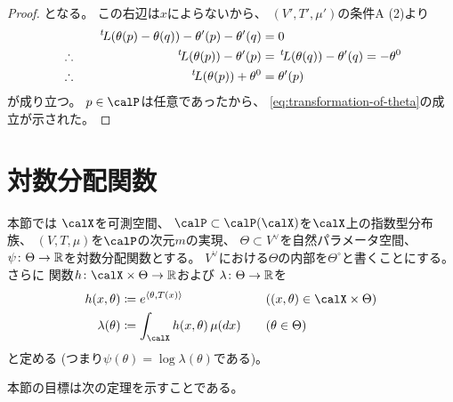 \documentclass[report]{jlreq}
\begin{document}
\begin{proof}
    となる。
    この右辺は$x$によらないから、
    $(V', T', \mu')$の条件A (2)より
    \begin{alignat}{2}
        &\phantom{\therefore} \quad&
            \,{}^{t}\!L(\theta(p) - \theta(q))
                - \theta'(p) - \theta'(q)
                &= 0
            \\
        &\therefore \quad&
            \,{}^{t}\!L(\theta(p)) - \theta'(p)
                &=
                    \,{}^{t}\!L(\theta(q)) - \theta'(q)
                =
                    - \theta^0
            \\
        &\therefore \quad&
            \,{}^{t}\!L(\theta(p)) + \theta^0
                &=
                    \theta'(p)
    \end{alignat}
    が成り立つ。
    $p \in \calP$は任意であったから、
    \cref{eq:transformation-of-theta}の成立が示された。
\end{proof}

%
\section{対数分配関数}


本節では
$\calX$を可測空間、
$\calP \subset \calP(\calX)$を$\calX$上の指数型分布族、
$(V, T, \mu)$を$\calP$の次元$m$の実現、
$\Theta \subset V^\vee$を自然パラメータ空間、
$\psi \colon \Theta \to \mathbb{R}$を対数分配関数とする。
$V^\vee$における$\Theta$の内部を$\Theta^\circ$と書くことにする。
さらに
関数$h \colon \calX \times \Theta \to \R$および
$\lambda \colon \Theta \to \mathbb{R}$を
\begin{alignat}{2}
    h(x, \theta)
        &\coloneqq e^{\langle \theta, T(x) \rangle}
        &&\quad ((x, \theta) \in \calX \times \Theta) \\
    \lambda(\theta)
        &\coloneqq \int_\calX h(x, \theta) \, \mu(dx)
        &&\quad (\theta \in \Theta)
\end{alignat}
と定める (つまり$\psi(\theta) = \log \lambda(\theta)$である)。

本節の目標は次の定理を示すことである。
\end{document}
